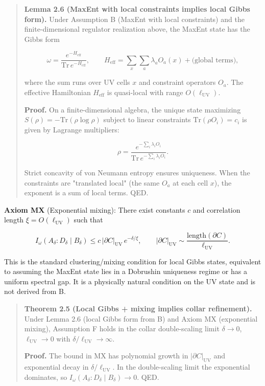 \begin{quote}
\textbf{Lemma 2.6 (MaxEnt with local constraints implies local Gibbs form).} Under Assumption B (MaxEnt with local constraints) and the finite-dimensional regulator realization above, the MaxEnt state has the Gibbs form

\[
\omega = \frac{e^{-H_{\mathrm{eff}}}}{\mathrm{Tr}\,e^{-H_{\mathrm{eff}}}},
\qquad
H_{\mathrm{eff}} = \sum_x \sum_a \lambda_a O_a(x) + \text{(global terms)},
\]

where the sum runs over UV cells \(x\) and constraint operators \(O_a\). The effective Hamiltonian \(H_{\mathrm{eff}}\) is quasi-local with range \(O(\ell_{\mathrm{UV}})\).

\textbf{Proof.} On a finite-dimensional algebra, the unique state maximizing \(S(\rho) = -\mathrm{Tr}(\rho \log \rho)\) subject to linear constraints \(\mathrm{Tr}(\rho O_i) = c_i\) is given by Lagrange multipliers:

\[
\rho = \frac{e^{-\sum_i \lambda_i O_i}}{\mathrm{Tr}\,e^{-\sum_i \lambda_i O_i}}.
\]

Strict concavity of von Neumann entropy ensures uniqueness. When the constraints are "translated local" (the same \(O_a\) at each cell \(x\)), the exponent is a sum of local terms. QED.
\end{quote}

\textbf{Axiom MX} (Exponential mixing): There exist constants \(c\) and correlation length \(\xi = O(\ell_{\mathrm{UV}})\) such that

\[
I_\omega(A_\delta:D_\delta \mid B_\delta) \le
c\,\lvert\partial C\rvert_{\mathrm{UV}}\,e^{-\delta/\xi},
\qquad
\lvert\partial C\rvert_{\mathrm{UV}} \sim \frac{\mathrm{length}(\partial C)}{\ell_{\mathrm{UV}}}.
\]

This is the standard clustering/mixing condition for local Gibbs states, equivalent to assuming the MaxEnt state lies in a Dobrushin uniqueness regime or has a uniform spectral gap. It is a physically natural condition on the UV state and is not derived from B.

\begin{quote}
\textbf{Theorem 2.5 (Local Gibbs + mixing implies collar refinement).} Under Lemma 2.6 (local Gibbs form from B) and Axiom MX (exponential mixing), Assumption F holds in the collar double-scaling limit \(\delta \to 0\), \(\ell_{\mathrm{UV}} \to 0\) with \(\delta/\ell_{\mathrm{UV}} \to \infty\).

\textbf{Proof.} The bound in MX has polynomial growth in \(\lvert\partial C\rvert_{\mathrm{UV}}\) and exponential decay in \(\delta/\ell_{\mathrm{UV}}\). In the double-scaling limit the exponential dominates, so \(I_\omega(A_\delta:D_\delta \mid B_\delta) \to 0\). QED.
\end{quote}

